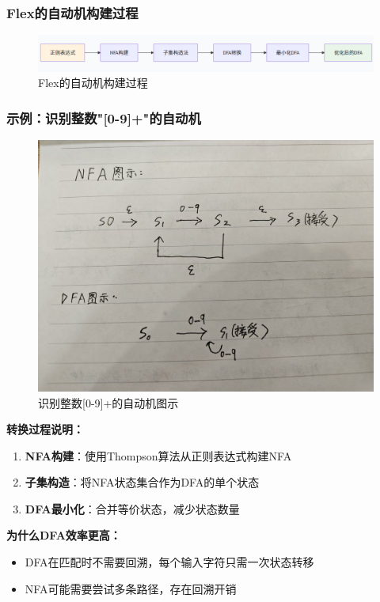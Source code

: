 \documentclass[twocolumn]{article}
\begin{document}
\subsubsection{Flex的自动机构建过程}
\begin{figure}[H]
    \centering
    \includegraphics[width=0.9\linewidth]{Flex_auto_create.png}
    \caption{Flex的自动机构建过程}
    \label{fig:flex_auto_create}
\end{figure}

\subsubsection{示例：识别整数"[0-9]+"的自动机}
\begin{figure}[H]
    \centering
    \includegraphics[width=0.8\linewidth]{example1.jpg}
    \caption{识别整数[0-9]+的自动机图示}
    \label{fig:example_nfa_dfa}
\end{figure}

\textbf{转换过程说明：}
\begin{enumerate}
    \item \textbf{NFA构建}：使用Thompson算法从正则表达式构建NFA
    \item \textbf{子集构造}：将NFA状态集合作为DFA的单个状态
    \item \textbf{DFA最小化}：合并等价状态，减少状态数量
\end{enumerate}

\textbf{为什么DFA效率更高：}
\begin{itemize}
    \item DFA在匹配时不需要回溯，每个输入字符只需一次状态转移
    \item NFA可能需要尝试多条路径，存在回溯开销
\end{itemize}
\end{document}
